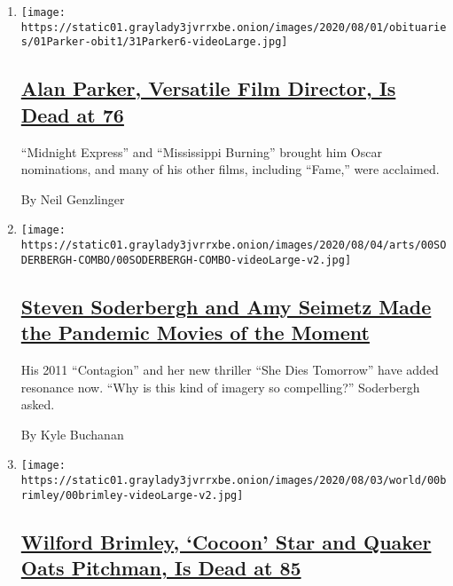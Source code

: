 \begin{enumerate}
\def\labelenumi{\arabic{enumi}.}
\item
  \texttt{[image: https://static01.graylady3jvrrxbe.onion/images/2020/08/01/obituaries/01Parker-obit1/31Parker6-videoLarge.jpg]}

  \hypertarget{alan-parker-versatile-film-director-is-dead-at-76}{%
  \subsection{\texorpdfstring{\href{/2020/07/31/movies/alan-parker-versatile-film-director-is-dead-at-76.html}{Alan
  Parker, Versatile Film Director, Is Dead at
  76}}{Alan Parker, Versatile Film Director, Is Dead at 76}}\label{alan-parker-versatile-film-director-is-dead-at-76}}

  ``Midnight Express'' and ``Mississippi Burning'' brought him Oscar
  nominations, and many of his other films, including ``Fame,'' were
  acclaimed.

  By Neil Genzlinger
\item
  \texttt{[image: https://static01.graylady3jvrrxbe.onion/images/2020/08/04/arts/00SODERBERGH-COMBO/00SODERBERGH-COMBO-videoLarge-v2.jpg]}

  \hypertarget{steven-soderbergh-and-amy-seimetz-made-the-pandemic-movies-of-the-moment}{%
  \subsection{\texorpdfstring{\href{/2020/07/31/movies/steven-soderbergh-amy-seimetz-pandemic.html}{Steven
  Soderbergh and Amy Seimetz Made the Pandemic Movies of the
  Moment}}{Steven Soderbergh and Amy Seimetz Made the Pandemic Movies of the Moment}}\label{steven-soderbergh-and-amy-seimetz-made-the-pandemic-movies-of-the-moment}}

  His 2011 ``Contagion'' and her new thriller ``She Dies Tomorrow'' have
  added resonance now. ``Why is this kind of imagery so compelling?''
  Soderbergh asked.

  By Kyle Buchanan
\item
  \texttt{[image: https://static01.graylady3jvrrxbe.onion/images/2020/08/03/world/00brimley/00brimley-videoLarge-v2.jpg]}

  \hypertarget{wilford-brimley-cocoon-star-and-quaker-oats-pitchman-is-dead-at-85}{%
  \subsection{\texorpdfstring{\href{/2020/08/01/obituaries/wilford-brimley-dead.html}{Wilford
  Brimley, `Cocoon' Star and Quaker Oats Pitchman, Is Dead at
  85}}{Wilford Brimley, `Cocoon' Star and Quaker Oats Pitchman, Is Dead at 85}}\label{wilford-brimley-cocoon-star-and-quaker-oats-pitchman-is-dead-at-85}}


\end{enumerate}
